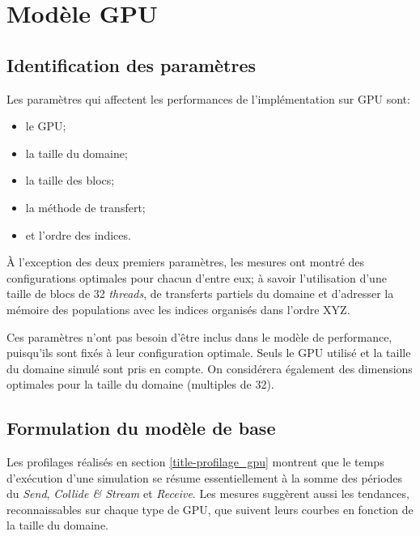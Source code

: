 \section{Modèle \acs{GPU}}
\subsection{Identification des paramètres}
Les paramètres qui affectent les performances de l'implémentation sur \acs{GPU} sont:
\begin{itemize}
\item le \acs{GPU};
\item la taille du domaine;
\item la taille des blocs;
\item la méthode de transfert;
\item et l'ordre des indices.
\end{itemize}
À l'exception des deux premiers paramètres, les mesures ont montré des configurations optimales pour chacun d'entre eux; à savoir l'utilisation d'une taille de blocs de 32 \textit{threads}, de transferts partiels du domaine et d'adresser la mémoire des populations avec les indices organisés dans l'ordre XYZ.

Ces paramètres n'ont pas besoin d'être inclus dans le modèle de performance, puisqu'ils sont fixés à leur configuration optimale. Seuls le \acs{GPU} utilisé et la taille du domaine simulé sont pris en compte. On considérera également des dimensions optimales pour la taille du domaine (multiples de 32).

\subsection{Formulation du modèle de base} \label{title-modele_performance}

\newcommand{\Time}[0]{T}
\newcommand{\cscoef}[0]{\Psi}
\newcommand{\scoef}[0]{\Gamma}
\newcommand{\rcoef}[0]{\digamma}



Les profilages réalisés en section \ref{title-profilage_gpu} montrent que le temps d'exécution d'une simulation se résume essentiellement à la somme des périodes du \textit{Send}, \textit{Collide \& Stream} et \textit{Receive}. Les mesures suggèrent aussi les tendances, reconnaissables sur chaque type de \acs{GPU}, que suivent leurs courbes en fonction de la taille du domaine.

